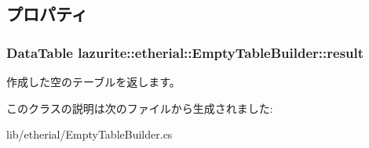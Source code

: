 \subsection{プロパティ}
\hypertarget{classlazurite_1_1etherial_1_1_empty_table_builder_a0e1fd9342c520bb875abb8054ff1b50c}{
\subsubsection[{result}]{\setlength{\rightskip}{0pt plus 5cm}DataTable lazurite::etherial::EmptyTableBuilder::result}}
\label{classlazurite_1_1etherial_1_1_empty_table_builder_a0e1fd9342c520bb875abb8054ff1b50c}


作成した空のテーブルを返します。 

このクラスの説明は次のファイルから生成されました:\begin{DoxyCompactItemize}
\item 
lib/etherial/EmptyTableBuilder.cs\end{DoxyCompactItemize}
